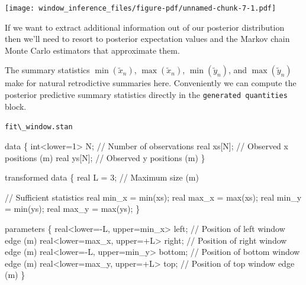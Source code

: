 \documentclass[
  letterpaper,
  DIV=11,
  numbers=noendperiod]{scrartcl}
\newenvironment{Shaded}{\begin{snugshade}}{\end{snugshade}}
\newcommand{\CommentTok}[1]{\textcolor[rgb]{0.37,0.37,0.37}{#1}}
\newcommand{\DataTypeTok}[1]{\textcolor[rgb]{0.68,0.00,0.00}{#1}}
\newcommand{\DecValTok}[1]{\textcolor[rgb]{0.68,0.00,0.00}{#1}}
\newcommand{\KeywordTok}[1]{\textcolor[rgb]{0.00,0.23,0.31}{#1}}
\newcommand{\NormalTok}[1]{\textcolor[rgb]{0.00,0.23,0.31}{#1}}
\begin{document}
\texttt{[image: window\_inference\_files/figure-pdf/unnamed-chunk-7-1.pdf]}

If we want to extract additional information out of our posterior
distribution then we'll need to resort to posterior expectation values
and the Markov chain Monte Carlo estimators that approximate them.

The summary statistics \(\min(\tilde{x}_{n})\), \(\max(\tilde{x}_{n})\),
\(\min(\tilde{y}_{n})\), and \(\max(\tilde{y}_{n})\) make for natural
retrodictive summaries here. Conveniently we can compute the posterior
predictive summary statistics directly in the
\texttt{generated\ quantities} block.

\begin{codelisting}

\caption{\texttt{fit\textbackslash\_window.stan}}

\begin{Shaded}
\begin{Highlighting}[]
\KeywordTok{data}\NormalTok{ \{}
  \DataTypeTok{int}\NormalTok{\textless{}}\KeywordTok{lower}\NormalTok{=}\DecValTok{1}\NormalTok{\textgreater{} N; }\CommentTok{// Number of observations}
  \DataTypeTok{real}\NormalTok{ xs[N];     }\CommentTok{// Observed x positions (m)}
  \DataTypeTok{real}\NormalTok{ ys[N];     }\CommentTok{// Observed y positions (m)}
\NormalTok{\}}

\KeywordTok{transformed data}\NormalTok{ \{}
  \DataTypeTok{real}\NormalTok{ L = }\DecValTok{3}\NormalTok{; }\CommentTok{// Maximum size (m)}

  \CommentTok{// Sufficient statistics}
  \DataTypeTok{real}\NormalTok{ min\_x = min(xs);}
  \DataTypeTok{real}\NormalTok{ max\_x = max(xs);}
  \DataTypeTok{real}\NormalTok{ min\_y = min(ys);}
  \DataTypeTok{real}\NormalTok{ max\_y = max(ys);}
\NormalTok{\}}

\KeywordTok{parameters}\NormalTok{ \{}
  \DataTypeTok{real}\NormalTok{\textless{}}\KeywordTok{lower}\NormalTok{={-}L, }\KeywordTok{upper}\NormalTok{=min\_x\textgreater{} left;   }\CommentTok{// Position of left window edge (m)}
  \DataTypeTok{real}\NormalTok{\textless{}}\KeywordTok{lower}\NormalTok{=max\_x, }\KeywordTok{upper}\NormalTok{=+L\textgreater{} right;  }\CommentTok{// Position of right window edge (m)}
  \DataTypeTok{real}\NormalTok{\textless{}}\KeywordTok{lower}\NormalTok{={-}L, }\KeywordTok{upper}\NormalTok{=min\_y\textgreater{} bottom; }\CommentTok{// Position of bottom window edge (m)}
  \DataTypeTok{real}\NormalTok{\textless{}}\KeywordTok{lower}\NormalTok{=max\_y, }\KeywordTok{upper}\NormalTok{=+L\textgreater{} top;    }\CommentTok{// Position of top window edge (m)}
\NormalTok{\}}


\end{Highlighting}
\end{Shaded}
\end{codelisting}
\end{document}
